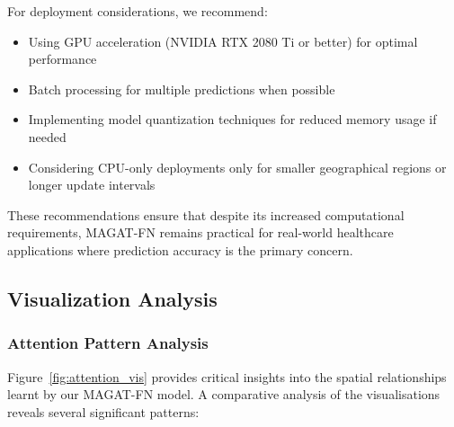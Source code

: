 \documentclass[lettersize, journal]{IEEEtran}
\begin{document}
For deployment considerations, we recommend:

\begin{itemize}
    \item Using GPU acceleration (NVIDIA RTX 2080 Ti or better) for optimal performance
    \item Batch processing for multiple predictions when possible
    \item Implementing model quantization techniques for reduced memory usage if needed
    \item Considering CPU-only deployments only for smaller geographical regions or longer update intervals
\end{itemize}

These recommendations ensure that despite its increased computational requirements, MAGAT-FN remains practical for real-world healthcare applications where prediction accuracy is the primary concern.

\subsection{Visualization Analysis}

\subsubsection{Attention Pattern Analysis}
Figure~\ref{fig:attention_vis} provides critical insights into the spatial relationships learnt by our MAGAT-FN model. A comparative analysis of the visualisations reveals several significant patterns:
\end{document}
